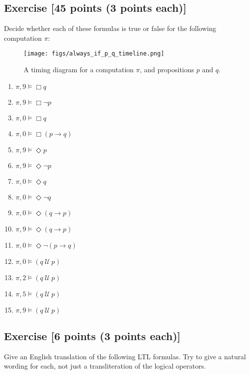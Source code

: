 \documentclass{elsarticle} %
\begin{document}
\subsection{Exercise [45 points (3 points each)]}
Decide whether each of these formulas is true or false for the following computation $\pi$:

\begin{figure}[H]

  \begin{center}
    \texttt{[image: figs/always\_if\_p\_q\_timeline.png]}
  \end{center}

\caption{A timing diagram for a computation $\pi$, and propositions $p$ and $q$.}
\end{figure}

\begin{enumerate}
\item $\pi, 9 \vDash \Box q$
\item $\pi, 9 \vDash \Box \neg p$
\item $\pi, 0 \vDash \Box q$
\item $\pi, 0 \vDash \Box(p \rightarrow q)$
\item $\pi, 9 \vDash \Diamond p$
\item $\pi, 9 \vDash \Diamond \neg p$
\item $\pi, 0 \vDash \Diamond q$
\item $\pi, 0 \vDash \Diamond \neg q$
\item $\pi, 0 \vDash \Diamond (q \rightarrow p)$
\item $\pi, 9 \vDash \Diamond (q \rightarrow p)$
\item $\pi, 0 \vDash \Diamond \neg (p \rightarrow q)$ 
\item $\pi, 0 \vDash (q \ \mathcal{U}\ p)$
\item $\pi, 2 \vDash (q \ \mathcal{U}\ p)$
\item $\pi, 5 \vDash (q \ \mathcal{U}\ p)$
\item $\pi, 9 \vDash (q \ \mathcal{U}\ p)$
\end{enumerate}


\subsection{Exercise [6 points (3 points each)]}
Give an English translation of the following LTL formulas. Try to give a natural wording for each, not just a transliteration of the logical operators.
\end{document}
